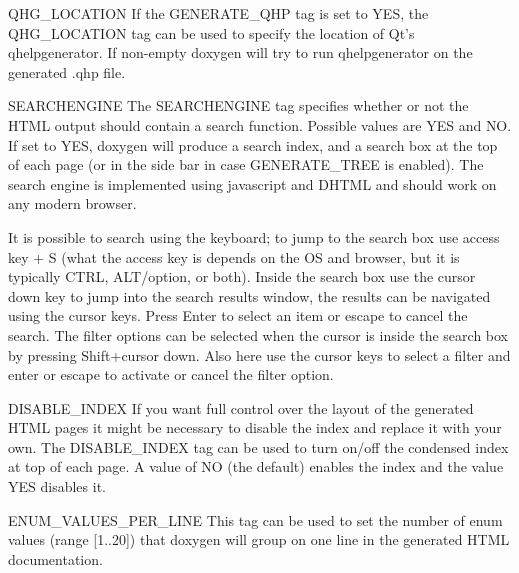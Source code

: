 \begin{DoxyDescription}
\label{config_cfg_qhg_location}
\hypertarget{config_cfg_qhg_location}{}
 
\item[{\ttfamily QHG\_\-LOCATION} ] If the GENERATE\_\-QHP tag is set to YES, the QHG\_\-LOCATION tag can be used to specify the location of Qt's qhelpgenerator. If non-\/empty doxygen will try to run qhelpgenerator on the generated .qhp file.

\label{config_cfg_searchengine}
\hypertarget{config_cfg_searchengine}{}
 
\item[{\ttfamily SEARCHENGINE} ] The {\ttfamily SEARCHENGINE} tag specifies whether or not the HTML output should contain a search function. Possible values are {\ttfamily YES} and {\ttfamily NO}. If set to YES, doxygen will produce a search index, and a search box at the top of each page (or in the side bar in case GENERATE\_\-TREE is enabled). The search engine is implemented using javascript and DHTML and should work on any modern browser.

It is possible to search using the keyboard; to jump to the search box use access key + S (what the access key is depends on the OS and browser, but it is typically CTRL, ALT/option, or both). Inside the search box use the cursor down key to jump into the search results window, the results can be navigated using the cursor keys. Press Enter to select an item or escape to cancel the search. The filter options can be selected when the cursor is inside the search box by pressing Shift+cursor down. Also here use the cursor keys to select a filter and enter or escape to activate or cancel the filter option.

\label{config_cfg_disable_index}
\hypertarget{config_cfg_disable_index}{}
 
\item[{\ttfamily DISABLE\_\-INDEX} ] If you want full control over the layout of the generated HTML pages it might be necessary to disable the index and replace it with your own. The {\ttfamily DISABLE\_\-INDEX} tag can be used to turn on/off the condensed index at top of each page. A value of NO (the default) enables the index and the value YES disables it.

\label{config_cfg_enum_values_per_line}
\hypertarget{config_cfg_enum_values_per_line}{}
 
\item[{\ttfamily ENUM\_\-VALUES\_\-PER\_\-LINE} ] This tag can be used to set the number of enum values (range \mbox{[}1..20\mbox{]}) that doxygen will group on one line in the generated HTML documentation.


\end{DoxyDescription}
